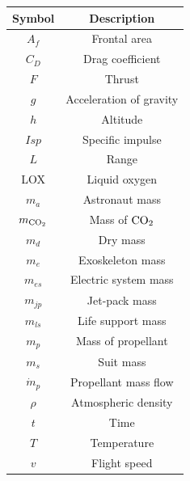 \documentclass[twocolumn]{article}
\newcommand{\COtwo}{\textnormal{CO}_2}
\begin{document}
\begin{table}[H]
  \centering
  \begin{tabular}{cc}
    \toprule
    Symbol & Description \\
    \midrule
    $A_f$ & Frontal area \\
    $C_D$ & Drag coefficient \\
    $F$ & Thrust \\
    $g$ & Acceleration of gravity \\
    $h$ & Altitude \\
    $Isp$ & Specific impulse \\
    $L$ & Range \\
    LOX & Liquid oxygen \\
    $m_a$ & Astronaut mass \\
    $m_{\COtwo}$ & Mass of $\COtwo$ \\
    $m_d$ & Dry mass \\
    $m_e$ & Exoskeleton mass \\
    $m_{es}$ & Electric system mass \\
    $m_{jp}$ & Jet-pack mass \\
    $m_{ls}$ & Life support mass \\
    $m_p$ & Mass of propellant \\
    $m_s$ & Suit mass \\
    $\dot{m}_p$ & Propellant mass flow \\
    $\rho$ & Atmospheric density \\
    $t$ & Time \\
    $T$ & Temperature \\
    $v$ & Flight speed \\
    \bottomrule
  \end{tabular}
\end{table}


\printbibliography
\end{document}

